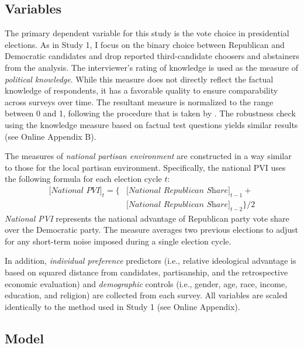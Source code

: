\documentclass[letterpaper, 12pt]{article}
\begin{document}
    \subsection*{Variables}
    
    \par The primary dependent variable for this study is the vote choice in presidential elections. As in Study 1, I focus on the binary choice between Republican and Democratic candidates and drop reported third-candidate choosers and abstainers from the analysis. The interviewer's rating of knowledge is used as the measure of \textit{political knowledge}. While this measure does not directly reflect the factual knowledge of respondents, it has a favorable quality to ensure comparability across surveys over time. The resultant measure is normalized to the range between 0 and 1, following the procedure that is taken by \cite{Bartels1996unvo}. The robustness check using the knowledge measure based on factual test questions yields similar results (see Online Appendix B).
    
    \par The measures of \textit{national partisan environment} are constructed in a way similar to those for the local partisan environment. Specifically, the national PVI uses the following formula for each election cycle $t$:
    \begin{align*}
        \textit{[National PVI]}_{t} = \{ & \textit{[National Republican Share]}_{t-1} + \\  
        &\textit{[National Republican Share]}_{t-2} \}/2
    \end{align*}
    \noindent \textit{National PVI} represents the national advantage of Republican party vote share over the Democratic party. The measure averages two previous elections to adjust for any short-term noise imposed during a single election cycle.
        
    \par In addition, \textit{individual preference} predictors (i.e., relative ideological advantage is based on squared distance from candidates, partisanship, and the retrospective economic evaluation) and \textit{demographic} controls (i.e., gender, age, race, income, education, and religion) are collected from each survey. All variables are scaled identically to the method used in Study 1 (see Online Appendix). 
        
    \subsection*{Model}
\end{document}
